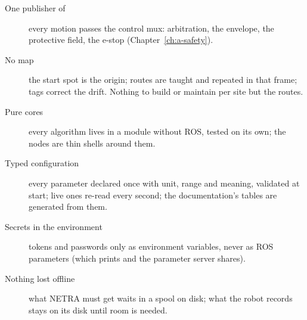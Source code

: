 \begin{description}
  \item[One publisher of ] every motion passes the control mux: arbitration, the
    envelope, the protective field, the e-stop (Chapter~\ref{ch:a-safety}).
  \item[No map] the start spot is the origin; routes are taught and repeated in that frame; tags
    correct the drift. Nothing to build or maintain per site but the routes.
  \item[Pure cores] every algorithm lives in a  module without ROS, tested on its own;
    the nodes are thin shells around them.
  \item[Typed configuration] every parameter declared once with unit, range and meaning, validated
    at start; live ones re-read every second; the documentation's tables are generated from them.
  \item[Secrets in the environment] tokens and passwords only as environment variables, never as
    ROS parameters (which  prints and the parameter server shares).
  \item[Nothing lost offline] what NETRA must get waits in a spool on disk; what the robot records
    stays on its disk until room is needed.
\end{description}
